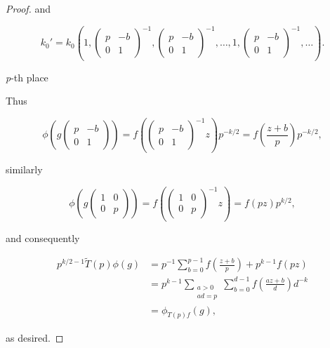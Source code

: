 \begin{proof}
and

\[
k_0' = k_0\left(1, \begin{pmatrix} p & -b \\ 0 & 1 \end{pmatrix}^{-1}, \begin{pmatrix} p & -b \\ 0 & 1 \end{pmatrix}^{-1}, \dots, 1, \begin{pmatrix} p & -b \\ 0 & 1 \end{pmatrix}^{-1}, \dots\right).
\]

\hfill \textit{p}-th place

Thus

\[
\phi\left(g\begin{pmatrix} p & -b \\ 0 & 1 \end{pmatrix}\right) = f\left(\begin{pmatrix} p & -b \\ 0 & 1 \end{pmatrix}^{-1}z\right)p^{-k/2} = f\left(\frac{z+b}{p}\right)p^{-k/2},
\]

similarly

\[
\phi\left(g\begin{pmatrix} 1 & 0 \\ 0 & p \end{pmatrix}\right) = f\left(\begin{pmatrix} 1 & 0 \\ 0 & p \end{pmatrix}^{-1}z\right) = f(pz)p^{k/2},
\]

and consequently

\[
\begin{aligned}
p^{k/2-1}\tilde{T}(p)\phi(g) &= p^{-1}\sum_{b=0}^{p-1}f\left(\frac{z+b}{p}\right) + p^{k-1}f(pz)\\
&= p^{k-1}\sum_{\substack{a > 0\\ ad = p}}\sum_{b=0}^{d-1}f\left(\frac{az+b}{d}\right)d^{-k}\\
&= \phi_{T(p)f}(g),
\end{aligned}
\]

as desired.

\end{proof}

